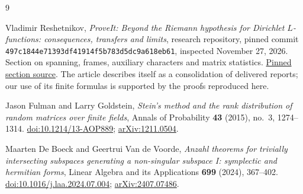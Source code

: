\documentclass[11pt]{article}
\theoremstyle{definition}
\theoremstyle{remark}
\begin{document}
\begin{thebibliography}{9}
\raggedright

Vladimir Reshetnikov, \emph{ProveIt: Beyond the Riemann hypothesis for Dirichlet $L$-functions: consequences, transfers and limits}, research repository, pinned commit
\texttt{497c1844e71393df41914f5b783d5dc9a618eb61}, inspected November 27, 2026.
Section on spanning, frames, auxiliary characters and matrix statistics.
\href{https://github.com/VladimirReshetnikov/ProveIt/blob/497c1844e71393df41914f5b783d5dc9a618eb61/Analysis/GeneralizedRiemannHypothesis/Article/sections/spn.tex}{Pinned section source}.
The article describes itself as a consolidation of delivered reports; our use of its finite formulas is supported by the proofs reproduced here.

Jason Fulman and Larry Goldstein, \emph{Stein's method and the rank distribution of random matrices over finite fields}, Annals of Probability \textbf{43} (2015), no.~3, 1274--1314.
\href{https://doi.org/10.1214/13-AOP889}{doi:10.1214/13-AOP889};
\href{https://arxiv.org/abs/1211.0504}{arXiv:1211.0504}.

Maarten De Boeck and Geertrui Van de Voorde, \emph{Anzahl theorems for trivially intersecting subspaces generating a non-singular subspace I: symplectic and hermitian forms}, Linear Algebra and its Applications \textbf{699} (2024), 367--402.
\href{https://doi.org/10.1016/j.laa.2024.07.004}{doi:10.1016/j.laa.2024.07.004};
\href{https://arxiv.org/abs/2407.07486}{arXiv:2407.07486}.

\end{thebibliography}
\end{document}

